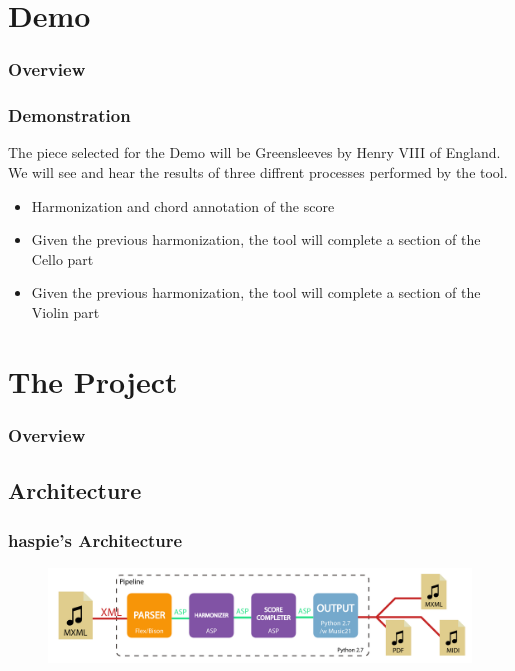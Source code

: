 \documentclass[english]{beamer}
\begin{document}
\section{Demo}
\begin{frame}
	\frametitle{Overview}
\end{frame}
	\begin{frame}
		\frametitle{Demonstration}
		The piece selected for the Demo will be Greensleeves by Henry VIII of England. We will see and hear the results of three diffrent processes performed by the tool.
		\begin{itemize}
			\item Harmonization and chord annotation of the score
			\item Given the previous harmonization, the tool will complete a section of the Cello part
			\item Given the previous harmonization, the tool will complete a section of the Violin part
		\end{itemize}
	\end{frame}

\section{The Project}
\begin{frame}
	\frametitle{Overview}
\end{frame}
\subsection{Architecture}
	\begin{frame}
		\frametitle{haspie's Architecture}
		\begin{figure}
		\centering
		\includegraphics[width=0.8\linewidth]{imagenes/arquitectura_final.pdf}
		\end{figure}
	\end{frame}
\end{document}
